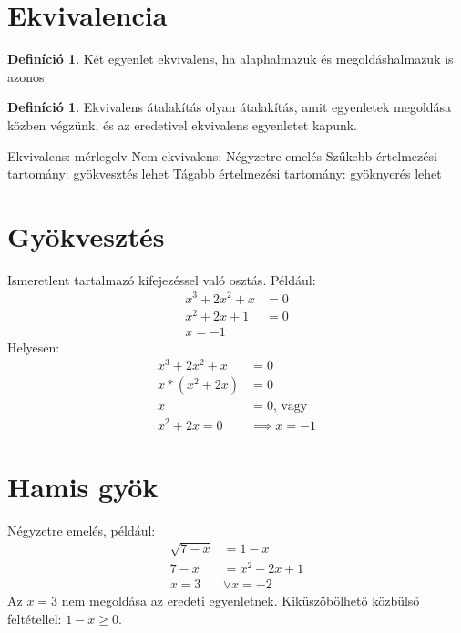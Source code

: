 \documentclass[twoside,12pt]{report}
\theoremstyle{definition}
\newtheorem{definition}[theorem]{Definíció}
\begin{document}
\section{Ekvivalencia}
	\begin{definition}
		Két egyenlet ekvivalens, ha alaphalmazuk és megoldáshalmazuk is azonos
	\end{definition}
	\begin{definition}
		Ekvivalens átalakítás olyan átalakítás, amit egyenletek megoldása közben végzünk, és az eredetivel ekvivalens egyenletet kapunk.
	\end{definition}
	\begin{outline}
		\1 Ekvivalens: mérlegelv
		\1 Nem ekvivalens: Négyzetre emelés
			\2 Szűkebb értelmezési tartomány: gyökvesztés lehet
			\2 Tágabb értelmezési tartomány: gyöknyerés lehet
	\end{outline}
\section{Gyökvesztés}
	Ismeretlent tartalmazó kifejezéssel való osztás. Például:
	\begin{align*}
		x^3+2x^2+x&=0\tag{Osztás nullával}\\
		x^2+2x+1&=0\\
		x=-1
	\end{align*}
	Helyesen:
	\begin{align*}
		x^3+2x^2+x&=0\\
		x*(x^2+2x)&=0\\
		x&=0\text{, vagy }\\
		x^2+2x=0&\implies x=-1
	\end{align*}
\section{Hamis gyök}
	Négyzetre emelés, például:
	\begin{align*}
		\sqrt{7-x}&=1-x\tag{Négyzetre emelés}\\
		7-x&=x^2-2x+1\\
		x=3&\vee x=-2
	\end{align*}
	Az $x=3$ nem megoldása az eredeti egyenletnek. Kiküszöbölhető közbülső feltétellel: $1-x\ge0$.
\end{document}
